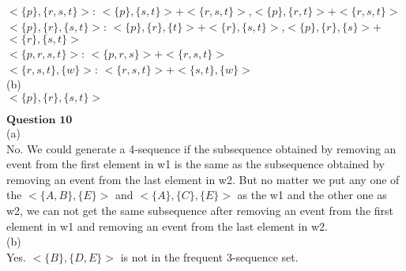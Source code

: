 \documentclass[12pt]{article}
\begin{document}
$<\{p\},\{r,s,t\}>$: $<\{p\},\{s,t\}>$+$<\{r,s,t\}>$,$<\{p\},\{r,t\}>$+$<\{r,s,t\}>$\\

$<\{p\},\{r\},\{s,t\}>$: $<\{p\},\{r\},\{t\}>$+$<\{r\},\{s,t\}>$,$<\{p\},\{r\},\{s\}>$+$<\{r\},\{s,t\}>$\\

$<\{p,r,s,t\}>$: $<\{p,r,s\}>$+$<\{r,s,t\}>$\\

$<\{r,s,t\},\{w\}>$: $<\{r,s,t\}>$+$<\{s,t\},\{w\}>$\\

(b)\\

$<\{p\},\{r\},\{s,t\}>$\\

\newpage

$\textbf{Question 10}$ \\

(a)\\

No. We could generate a 4-sequence if the subsequence obtained by removing an event from the first element in w1 is the same as the subsequence obtained by removing an event from the last element in w2. But no matter we put any one of the $<\{A,B\},\{E\}>$ and $<\{A\},\{C\},\{E\}>$ as the w1 and the other one as w2, we can not get the 
same subsequence after removing an event from the first element in w1 and removing an event from the last element in w2.\\

(b)\\

Yes. $<\{B\},\{D,E\}>$ is not in the frequent 3-sequence set.
\end{document}
